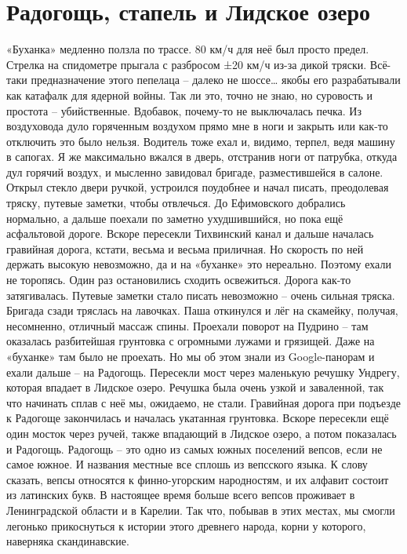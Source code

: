 \chapter{Радогощь, стапель и Лидское озеро} 

«Буханка» медленно ползла по трассе. 80 км/ч для неё был просто предел. Стрелка на спидометре прыгала с разбросом ±20 км/ч из-за дикой тряски. Всё-таки предназначение этого пепелаца – далеко не шоссе… якобы его разрабатывали как катафалк для ядерной войны. Так ли это, точно не знаю, но суровость и простота – убийственные. Вдобавок, почему-то не выключалась печка. Из воздуховода дуло горяченным воздухом прямо мне в ноги и закрыть или как-то отключить это было нельзя. Водитель тоже ехал и, видимо, терпел, ведя машину в сапогах. Я же максимально вжался в дверь, отстранив ноги от патрубка, откуда дул горячий воздух, и мысленно завидовал бригаде, разместившейся в салоне. Открыл стекло двери ручкой, устроился поудобнее и начал писать, преодолевая тряску, путевые заметки, чтобы отвлечься. 
До Ефимовского добрались нормально, а дальше поехали по заметно ухудшившийся, но пока ещё асфальтовой дороге. Вскоре пересекли Тихвинский канал и дальше началась гравийная дорога, кстати, весьма и весьма приличная. Но скорость по ней держать высокую невозможно, да и на «буханке» это нереально. Поэтому ехали не торопясь. Один раз остановились сходить освежиться. Дорога как-то затягивалась. Путевые заметки стало писать невозможно – очень сильная тряска. Бригада сзади тряслась на лавочках. Паша откинулся и лёг на скамейку, получая, несомненно, отличный массаж спины.
Проехали поворот на Пудрино – там оказалась разбитейшая грунтовка с огромными лужами и грязищей. Даже на «буханке» там было не проехать. Но мы об этом знали из Google-панорам и ехали дальше – на Радогощь. Пересекли мост через маленькую речушку Ундрегу, которая впадает в Лидское озеро. Речушка была очень узкой и заваленной, так что начинать сплав с неё мы, ожидаемо, не стали. Гравийная дорога при подъезде к Радогоще закончилась и началась укатанная грунтовка. Вскоре пересекли ещё один мосток через ручей, также впадающий в Лидское озеро, а потом показалась и Радогощь. 
Радогощь – это одно из самых южных поселений вепсов, если не самое южное. И названия местные все сплошь из вепсского языка. К слову сказать, вепсы относятся к финно-угорским народностям, и их алфавит состоит из латинских букв. В настоящее время больше всего вепсов проживает в Ленинградской области и в Карелии. Так что, побывав в этих местах, мы смогли легонько прикоснуться к истории этого древнего народа, корни у которого, наверняка скандинавские. 
